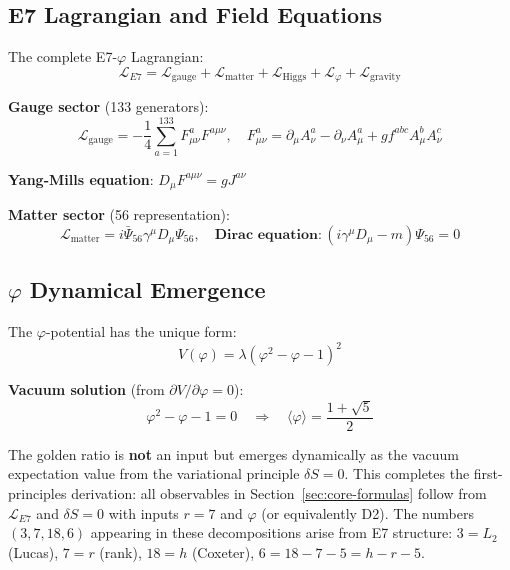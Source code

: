 \documentclass[11pt,a4paper]{article}
\begin{document}
\subsection{E7 Lagrangian and Field Equations}

The complete E7-$\varphi$ Lagrangian:
\begin{equation}
\mathcal{L}_{E7} = \mathcal{L}_{\text{gauge}} + \mathcal{L}_{\text{matter}} + \mathcal{L}_{\text{Higgs}} + \mathcal{L}_{\varphi} + \mathcal{L}_{\text{gravity}}
\end{equation}

\textbf{Gauge sector} (133 generators):
\begin{equation}
\mathcal{L}_{\text{gauge}} = -\frac{1}{4} \sum_{a=1}^{133} F^a_{\mu\nu} F^{a\mu\nu}, \quad F^a_{\mu\nu} = \partial_\mu A^a_\nu - \partial_\nu A^a_\mu + g f^{abc} A^b_\mu A^c_\nu
\end{equation}

\textbf{Yang-Mills equation}: $\boxed{D_\mu F^{a\mu\nu} = g J^{a\nu}}$

\textbf{Matter sector} (56 representation):
\begin{equation}
\mathcal{L}_{\text{matter}} = i\bar{\Psi}_{56} \gamma^\mu D_\mu \Psi_{56}, \quad \textbf{Dirac equation}: \boxed{(i\gamma^\mu D_\mu - m)\Psi_{56} = 0}
\end{equation}

\subsection{$\varphi$ Dynamical Emergence}

The $\varphi$-potential has the unique form:
\begin{equation}
\boxed{V(\varphi) = \lambda(\varphi^2 - \varphi - 1)^2}
\end{equation}

\textbf{Vacuum solution} (from $\partial V/\partial\varphi = 0$):
\begin{equation}
\varphi^2 - \varphi - 1 = 0 \quad \Rightarrow \quad \boxed{\langle \varphi \rangle = \frac{1 + \sqrt{5}}{2}}
\end{equation}

The golden ratio is \textbf{not} an input but emerges dynamically as the vacuum expectation value from the variational principle $\delta S = 0$. This completes the first-principles derivation: all observables in Section~\ref{sec:core-formulas} follow from $\mathcal{L}_{E7}$ and $\delta S = 0$ with inputs $r=7$ and $\varphi$ (or equivalently D2).
The numbers $(3, 7, 18, 6)$ appearing in these decompositions arise from E7 structure: $3 = L_2$ (Lucas), $7 = r$ (rank), $18 = h$ (Coxeter), $6 = 18 - 7 - 5 = h - r - 5$.
\end{document}
